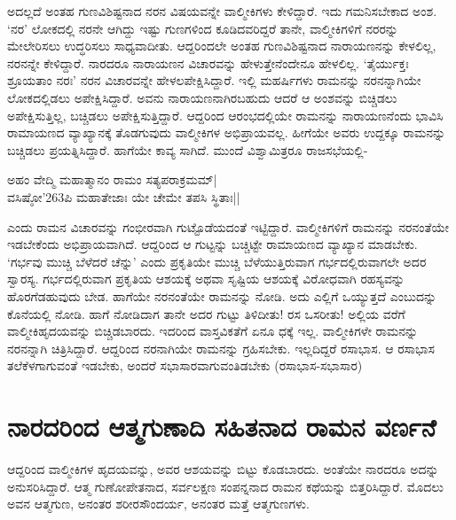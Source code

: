 ಅದಲ್ಲದೆ ಅಂತಹ ಗುಣವಿಶಿಷ್ಟನಾದ ನರನ ವಿಷಯವನ್ನೇ ವಾಲ್ಮೀಕಿಗಳು ಕೇಳಿದ್ದಾರೆ. ಇದು ಗಮನಿಸಬೇಕಾದ ಅಂಶ. `ನರ' ಲೋಕದಲ್ಲಿ ನರನೇ ಆಗಿದ್ದು ಇಷ್ಟು ಗುಣಗಳಿಂದ ಕೂಡಿದವರಿದ್ದರೆ ತಾನೇ, ವಾಲ್ಮೀಕಿಗಳಿಗೆ ನರರನ್ನು ಮೇಲೇರಿಸಲು ಉದ್ಧರಿಸಲು ಸಾಧ್ಯವಾದೀತು. ಆದ್ದರಿಂದಲೇ ಅಂತಹ ಗುಣವಿಶಿಷ್ಟನಾದ ನಾರಾಯಣನನ್ನು ಕೇಳಲಿಲ್ಲ, ನರನನ್ನೇ ಕೇಳಿದ್ದಾರೆ. ನಾರದರೂ ನಾರಾಯಣನ ವಿಚಾರವನ್ನು ಹೇಳುತ್ತೇನೆಂದೇನೂ ಹೇಳಲಿಲ್ಲ. `ತೈರ್ಯುಕ್ತಃ ಶ್ರೂಯತಾಂ ನರಃ' ನರನ ವಿಚಾರವನ್ನೇ ಹೇಳಲಪೇಕ್ಷಿಸಿದ್ದಾರೆ. ಇಲ್ಲಿ ಮಹರ್ಷಿಗಳು ರಾಮನನ್ನು ನರನನ್ನಾಗಿಯೇ ಲೋಕದಲ್ಲಿಡಲು ಅಪೇಕ್ಷಿಸಿದ್ದಾರೆ. ಅವನು ನಾರಾಯಣನಾಗಿರಬಹುದು ಆದರೆ ಆ ಅಂಶವನ್ನು ಬಿಚ್ಚಿಡಲು ಅಪೇಕ್ಷಿಸುತ್ತಿಲ್ಲ, ಬಚ್ಚಿಡಲು ಅಪೇಕ್ಷಿಸುತ್ತಿದ್ದಾರೆ. ಆದ್ದರಿಂದ ಆರಂಭದಲ್ಲಿಯೇ ರಾಮನನ್ನು ನಾರಾಯಣನೆಂದು ಭಾವಿಸಿ ರಾಮಾಯಣದ ವ್ಯಾಖ್ಯಾನಕ್ಕೆ ತೊಡಗುವುದು ವಾಲ್ಮೀಕಿಗಳ ಅಭಿಪ್ರಾಯವಲ್ಲ. ಹೀಗೆಯೇ ಅವರು ಉದ್ದಕ್ಕೂ ರಾಮನನ್ನು ಬಚ್ಚಿಡಲು ಪ್ರಯತ್ನಿಸಿದ್ದಾರೆ. ಹಾಗೆಯೇ ಕಾವ್ಯ ಸಾಗಿದೆ. ಮುಂದೆ ವಿಶ್ವಾಮಿತ್ರರೂ ರಾಜಸಭೆಯಲ್ಲಿ- 

\begin{shloka} 
ಅಹಂ ವೇದ್ಮಿ ಮಹಾತ್ಮಾನಂ ರಾಮಂ ಸತ್ಯಪರಾಕ್ರಮಮ್‍|\\ 
ವಸಿಷ್ಠೋ\char'263ಪಿ ಮಹಾತೇಜಾಃ ಯೇ ಚೇಮೇ ತಪಸಿ ಸ್ಥಿತಾಃ||
\end{shloka}
ಎಂದು ರಾಮನ ವಿಚಾರವನ್ನು ಗಂಭೀರವಾಗಿ ಗುಟ್ಟೊಡೆಯದಂತೆ ಇಟ್ಟಿದ್ದಾರೆ. ವಾಲ್ಮೀಕಿಗಳಿಗೆ ರಾಮನನ್ನು ನರನಂತೆಯೇ ಇಡಬೇಕೆಂದು ಅಭಿಪ್ರಾಯವಾಗಿದೆ. ಆದ್ದರಿಂದ ಆ ಗುಟ್ಟನ್ನು ಬಚ್ಚಿಟ್ಟೇ ರಾಮಾಯಣದ ವ್ಯಾಖ್ಯಾನ ಮಾಡಬೇಕು. `ಗರ್ಭವು ಮುಚ್ಚಿ ಬೆಳೆದರೆ ಚೆನ್ನು' ಎಂದು ಪ್ರಕೃತಿಯೇ ಮುಚ್ಚಿ ಬೆಳೆಯುತ್ತಿರುವಾಗ ಗರ್ಭದಲ್ಲಿರುವಾಗಲೇ ಅದರ ಸ್ವಾರಸ್ಯ. ಗರ್ಭದಲ್ಲಿರುವಾಗ ಪ್ರಕೃತಿಯ ಆಶಯಕ್ಕೆ ಅಥವಾ ಸೃಷ್ಟಿಯ ಆಶಯಕ್ಕೆ ವಿರೋಧವಾಗಿ ರಹಸ್ಯವನ್ನು ಹೊರಗೆಡಹುವುದು ಬೇಡ. ಹಾಗೆಯೇ ನರನಂತೆಯೇ ರಾಮನನ್ನು ನೋಡಿ. ಅದು ಎಲ್ಲಿಗೆ ಒಯ್ಯುತ್ತದೆ ಎಂಬುದನ್ನು ಕೊನೆಯಲ್ಲಿ ನೋಡಿ. ಹಾಗೆ ನೋಡಿದಾಗ ತಾನೇ ಅದರ ಗುಟ್ಟು ತಿಳಿದೀತು! ರಸ ಒಸರೀತು! ಅಲ್ಲಿಯ ವರೆಗೆ ವಾಲ್ಮೀಕಿಹೃದಯವನ್ನು ಬಿಚ್ಚಿಡಬಾರದು. ಇದರಿಂದ ವಾಸ್ತವಿಕತೆಗೆ ಏನೂ ಧಕ್ಕೆ ಇಲ್ಲ. ವಾಲ್ಮೀಕಿಗಳೇ ರಾಮನನ್ನು ನರನನ್ನಾಗಿ ಚಿತ್ರಿಸಿದ್ದಾರೆ. ಆದ್ದರಿಂದ ನರನಾಗಿಯೇ ರಾಮನನ್ನು ಗ್ರಹಿಸಬೇಕು. ಇಲ್ಲದಿದ್ದರೆ ರಸಾಭಾಸ. ಆ ರಸಾಭಾಸ ತಲೆಕೆಳಗಾಗುವಂತೆ ಇಡಬೇಕು, ಅಂದರೆ ಸಭಾಸಾರವಾಗುವಂತಿಡಬೇಕು (ರಸಾಭಾಸ-ಸಭಾಸಾರ) 

\section*{ನಾರದರಿಂದ ಆತ್ಮಗುಣಾದಿ ಸಹಿತನಾದ ರಾಮನ ವರ್ಣನೆ} 

ಆದ್ದರಿಂದ ವಾಲ್ಮೀಕಿಗಳ ಹೃದಯವನ್ನು, ಅವರ ಆಶಯವನ್ನು ಬಿಟ್ಟು ಕೊಡಬಾರದು. ಅಂತೆಯೇ ನಾರದರೂ ಅದನ್ನು ಅನುಸರಿಸಿದ್ದಾರೆ. ಆತ್ಮ ಗುಣೋಪೇತನಾದ, ಸರ್ವಲಕ್ಷಣ ಸಂಪನ್ನನಾದ ರಾಮನ ಕಥೆಯನ್ನು ಬಿತ್ತರಿಸಿದ್ದಾರೆ. ಮೊದಲು ಅವನ ಆತ್ಮಗುಣ, ಅನಂತರ ಶರೀರಸೌಂದರ್ಯ, ಅನಂತರ ಮತ್ತೆ ಆತ್ಮಗುಣಗಳು. 

